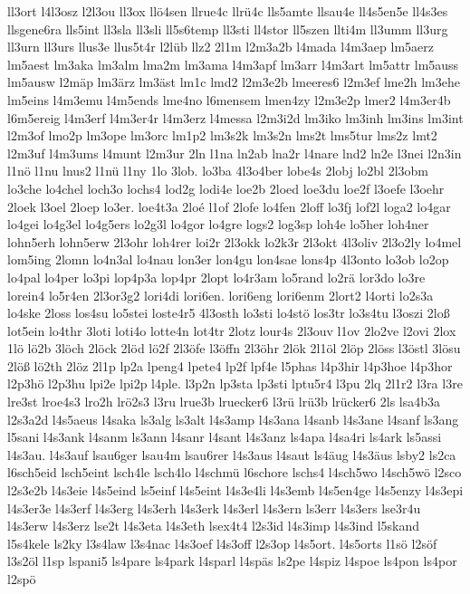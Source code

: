 {ll3ort
l4l3osz
l2l3ou
ll3ox
llö4sen
llrue4c
llrü4c
lls5amte
llsau4e
ll4s5en5e
ll4s3es
llsgene6ra
lls5int
ll3sla
ll3sli
ll5s6temp
ll3sti
ll4stor
ll5szen
llti4m
ll3umm
ll3urg
ll3urn
ll3urs
llus3e
llus5t4r
l2lüb
llz2
2l1m
l2m3a2b
l4mada
l4m3aep
lm5aerz
lm5aest
lm3aka
lm3alm
lma2m
lm3ama
l4m3apf
lm3arr
l4m3art
lm5attr
lm5auss
lm5ausw
l2mäp
lm3ärz
lm3äst
lm1c
lmd2
l2m3e2b
lmeeres6
l2m3ef
lme2h
lm3ehe
lm5eins
l4m3emu
l4m5ends
lme4no
l6mensem
lmen4zy
l2m3e2p
lmer2
l4m3er4b
l6m5ereig
l4m3erf
l4m3er4r
l4m3erz
l4messa
l2m3i2d
lm3iko
lm3inh
lm3ins
lm3int
l2m3of
lmo2p
lm3ope
lm3orc
lm1p2
lm3s2k
lm3s2n
lms2t
lms5tur
lms2z
lmt2
l2m3uf
l4m3ums
l4munt
l2m3ur
2ln
l1na
ln2ab
lna2r
l4nare
lnd2
ln2e
l3nei
l2n3in
l1nö
l1nu
lnus2
l1nü
l1ny
1lo
3lob.
lo3ba
4l3o4ber
lobe4s
2lobj
lo2bl
2l3obm
lo3che
lo4chel
loch3o
lochs4
lod2g
lodi4e
loe2b
2loed
loe3du
loe2f
l3oefe
l3oehr
2loek
l3oel
2loep
lo3er.
loe4t3a
2loé
l1of
2lofe
lo4fen
2loff
lo3fj
lof2l
loga2
lo4gar
lo4gei
lo4g3el
lo4g5ers
lo2g3l
lo4gor
lo4gre
logs2
log3sp
loh4e
lo5her
loh4ner
lohn5erh
lohn5erw
2l3ohr
loh4rer
loi2r
2l3okk
lo2k3r
2l3okt
4l3oliv
2l3o2ly
lo4mel
lom5ing
2lomn
lo4n3al
lo4nau
lon3er
lon4gu
lon4sae
lons4p
4l3onto
lo3ob
lo2op
lo4pal
lo4per
lo3pi
lop4p3a
lop4pr
2lopt
lo4r3am
lo5rand
lo2rä
lor3do
lo3re
lorein4
lo5r4en
2l3or3g2
lori4di
lori6en.
lori6eng
lori6enm
2lort2
l4orti
lo2s3a
lo4ske
2loss
los4su
lo5stei
loste4r5
4l3osth
lo3sti
lo4stö
los3tr
lo3s4tu
l3oszi
2loß
lot5ein
lo4thr
3loti
loti4o
lotte4n
lot4tr
2lotz
lour4s
2l3ouv
l1ov
2lo2ve
l2ovi
2lox
1lö
lö2b
3löch
2löck
2löd
lö2f
2l3öfe
l3öffn
2l3öhr
2lök
2l1öl
2löp
2löss
l3östl
3lösu
2löß
lö2th
2löz
2l1p
lp2a
lpeng4
lpete4
lp2f
lpf4e
l5phas
l4p3hir
l4p3hoe
l4p3hor
l2p3hö
l2p3hu
lpi2e
lpi2p
l4ple.
l3p2n
lp3sta
lp3sti
lptu5r4
l3pu
2lq
2l1r2
l3ra
l3re
lre3st
lroe4s3
lro2h
lrö2s3
l3ru
lrue3b
lruecker6
l3rü
lrü3b
lrücker6
2ls
lsa4b3a
l2s3a2d
l4s5aeus
l4saka
ls3alg
ls3alt
l4s3amp
l4s3ana
l4sanb
l4s3ane
l4sanf
ls3ang
l5sani
l4s3ank
l4sanm
ls3ann
l4sanr
l4sant
l4s3anz
ls4apa
l4sa4ri
ls4ark
ls5assi
l4s3au.
l4s3auf
lsau6ger
lsau4m
lsau6rer
l4s3aus
l4saut
ls4äug
l4s3äus
lsby2
ls2ca
l6sch5eid
lsch5eint
lsch4le
lsch4lo
l4schmü
l6schore
lschs4
l4sch5wo
l4sch5wö
l2sco
l2s3e2b
l4s3eie
l4s5eind
ls5einf
l4s5eint
l4s3e4li
l4s3emb
l4s5en4ge
l4s5enzy
l4s3epi
l4s3er3e
l4s3erf
l4s3erg
l4s3erh
l4s3erk
l4s3erl
l4s3ern
ls3err
l4s3ers
lse3r4u
l4s3erw
l4s3erz
lse2t
l4s3eta
l4s3eth
lsex4t4
l2s3id
l4s3imp
l4s3ind
l5skand
l5s4kele
ls2ky
l3s4law
l3s4nac
l4s3oef
l4s3off
l2s3op
l4s5ort.
l4s5orts
l1sö
l2söf
l3s2öl
l1sp
lspani5
ls4pare
ls4park
l4sparl
l4späs
ls2pe
l4spiz
l4spoe
ls4pon
ls4por
l2spö
}
